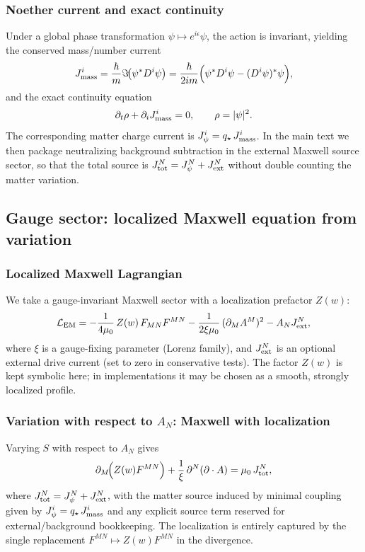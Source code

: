 \documentclass[11pt]{article}
\newcommand{\qstar}{q_\star}
\begin{document}
\subsubsection{Noether current and exact continuity}
Under a global phase transformation $\psi\mapsto e^{i\epsilon}\psi$, the action is
invariant, yielding the conserved mass/number current
\begin{align}
J^i_{\rm mass}
=\frac{\hbar}{m}\Im\!\big(\psi^\ast D^i\psi\big)
=\frac{\hbar}{2im}\Big(\psi^\ast D^i\psi - (D^i\psi)^\ast\psi\Big),
\label{eq:current_def}
\end{align}
and the exact continuity equation
\begin{align}
\partial_t\rho+\partial_i J^i_{\rm mass}=0,
\qquad \rho=|\psi|^2.
\label{eq:continuity_4d}
\end{align}
The corresponding matter charge current is $J^i_{\psi}=\qstar\,J^i_{\rm mass}$. In the main
text we then package neutralizing background subtraction in the external Maxwell
source sector, so that the total source is $J^N_{\rm tot}=J^N_{\psi}+J^N_{\rm ext}$ without double counting the matter variation.

\subsection{Gauge sector: localized Maxwell equation from variation}
\subsubsection{Localized Maxwell Lagrangian}
We take a gauge-invariant Maxwell sector with a localization prefactor $Z(w)$:
\begin{align}
\mathcal{L}_{\rm EM}
=
-\frac{1}{4\mu_0}\,Z(w)\,F_{MN}F^{MN}
-\frac{1}{2\xi\mu_0}\,(\partial_M A^M)^2
- A_N J^N_{\rm ext},
\label{eq:LEM}
\end{align}
where $\xi$ is a gauge-fixing parameter (Lorenz family), and $J^N_{\rm ext}$ is an
optional external drive current (set to zero in conservative tests).  The factor
$Z(w)$ is kept symbolic here; in implementations it may be chosen as a smooth,
strongly localized profile.

\subsubsection{Variation with respect to \texorpdfstring{$A_N$}{A\_N}: Maxwell with localization}
Varying $S$ with respect to $A_N$ gives
\begin{align}
\partial_M\!\Big(Z(w)F^{MN}\Big)
+\frac{1}{\xi}\,\partial^N(\partial\cdot A)
=
\mu_0\,J^N_{\rm tot},
\label{eq:maxwell_localized}
\end{align}
where $J^N_{\rm tot}=J^N_{\psi}+J^N_{\rm ext}$, with the matter source induced by minimal coupling given by $J^i_{\psi}=\qstar\,J^i_{\rm mass}$ and any explicit source term reserved for external/background bookkeeping. The localization is entirely captured by the single replacement $F^{MN}\mapsto Z(w)F^{MN}$ in the divergence.
\end{document}
